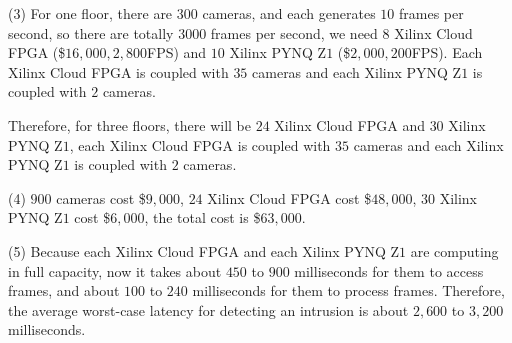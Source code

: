 \documentclass[11pt]{article}
\begin{document}
\begin{solution}
\item (3) For one floor, there are $300$ cameras, and each generates $10$ frames per second, so there are totally $3000$ frames per second, we need $8$ Xilinx Cloud FPGA (\$$16,000, 2,800$FPS) and $10$ Xilinx PYNQ Z$1$ (\$$2,000, 200$FPS). Each Xilinx Cloud FPGA is coupled with $35$ cameras and each Xilinx PYNQ Z$1$ is coupled with $2$ cameras.
\item Therefore, for three floors, there will be $24$ Xilinx Cloud FPGA and $30$ Xilinx PYNQ Z$1$, each Xilinx Cloud FPGA is coupled with $35$ cameras and each Xilinx PYNQ Z$1$ is coupled with $2$ cameras.
\item (4) $900$ cameras cost \$$9,000$, $24$ Xilinx Cloud FPGA cost \$$48,000$, $30$ Xilinx PYNQ Z$1$ cost \$$6,000$, the total cost is \$$63,000$.
\item (5) Because each Xilinx Cloud FPGA and each Xilinx PYNQ Z$1$ are computing in full capacity, now it takes about $450$ to $900$ milliseconds for them to access frames, and about $100$ to $240$ milliseconds for them to process frames. Therefore, the average worst-case latency for detecting an intrusion is about $2,600$ to $3,200$ milliseconds.

\end{solution}
\end{document}
